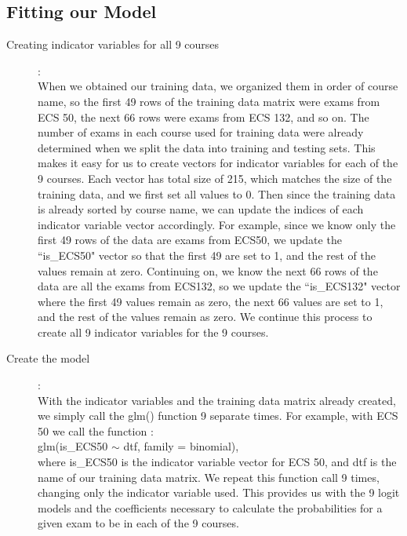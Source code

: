 \documentclass{article}
\begin{document}
    \subsection{Fitting our Model}
        \begin{description}
        \item[Creating indicator variables for all 9 courses]:\\
        When we obtained our training data, we organized them in order of course name, so the first 49 rows of the training data matrix were exams from ECS 50, the next 66 rows were exams from ECS 132, and so on. The number of exams in each course used for training data were already determined when we split the data into training and testing sets. This makes it easy for us to create vectors for indicator variables for each of the 9 courses. Each vector has total size of 215, which matches the size of the training data, and we first set all values to 0. Then since the training data is already sorted by course name, we can update the indices of each indicator variable vector accordingly. For example, since we know only the first 49 rows of the data are exams from ECS50, we update the ``is\_ECS50" vector so that the first 49 are set to 1, and the rest of the values remain at zero. Continuing on, we know the next 66 rows of the data are all the exams from ECS132, so we update the ``is\_ECS132" vector where the first 49 values remain as zero, the next 66 values are set to 1, and the rest of the values remain as zero. We continue this process to create all 9 indicator variables for the 9 courses. 
        \item [Create the model]: \\
        With the indicator variables and the training data matrix already created, we simply call the glm() function 9 separate times. For example, with ECS 50 we call the function : \\
        glm(is\_ECS50 $\sim$ dtf, family = binomial), \\
        where is\_ECS50 is the indicator variable vector for ECS 50, and dtf is the name of our training data matrix. We repeat this function call 9 times, changing only the indicator variable used. This provides us with the 9 logit models and the coefficients necessary to calculate the probabilities for a given exam to be in each of the 9 courses.
        

\end{description}
\end{document}
